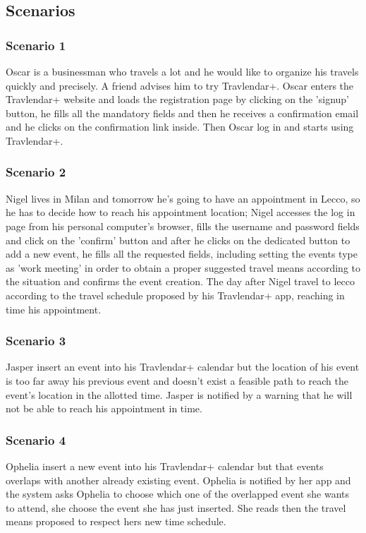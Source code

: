 \subsection{Scenarios}
\label{subsect:Scenarios}
	\subsubsection{Scenario 1}
		Oscar is a businessman who travels a lot and he would like to organize his travels quickly and precisely. A friend advises him to try Travlendar+. Oscar enters the Travlendar+ website and loads the registration page by clicking on the 'signup' button, he fills all the mandatory fields and then he receives a confirmation email and he clicks on the confirmation link inside.
Then Oscar log in and starts using Travlendar+.
	\subsubsection{Scenario 2}
		Nigel lives in Milan and tomorrow he’s going to have an appointment in Lecco, so he has to decide how to reach his appointment location; Nigel accesses the log in page from his personal computer's browser, fills the username and password fields and click on the 'confirm' button and after he clicks on the dedicated button to add a new event, he fills all the requested fields, including setting the events type as 'work meeting' in order to obtain a proper suggested travel means according to the situation and confirms the event creation. The day after Nigel travel to lecco according to the travel schedule proposed by his Travlendar+ app, reaching in time his appointment.

	\subsubsection{Scenario 3}
		Jasper insert an event into his Travlendar+ calendar but the location of his event is too far away his previous event and doesn't exist a feasible path to reach the event’s location in the allotted time. Jasper is notified by a warning that he will not be able to reach his appointment in time.	
	\subsubsection{Scenario 4}
		Ophelia insert a new event into his Travlendar+ calendar but that events overlaps with another already existing event. Ophelia is notified by her app and the system asks Ophelia to choose which one of the overlapped event she wants to attend, she choose the event she has just inserted. She reads then the travel means proposed to respect hers new time schedule.
